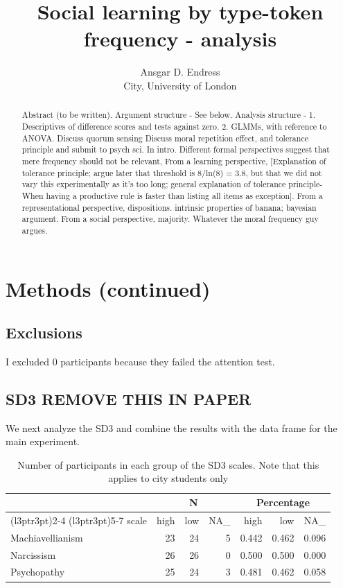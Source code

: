 \documentclass[
]{article}
\title{Social learning by type-token frequency - analysis}
\author{Ansgar D. Endress\\
City, University of London}
\date{}
\begin{document}
\maketitle
\begin{abstract}
Abstract (to be written). Argument structure - See below. Analysis structure - 1. Descriptives of difference scores and tests against zero. 2. GLMMs, with reference to ANOVA. Discuss quorum sensing \citep{Sumpter2009} Discuss moral repetition effect, and tolerance principle and submit to psych sci. In intro. Different formal perspectives suggest that mere frequency should not be relevant, From a learning perspective, {[}Explanation of tolerance principle; argue later that threshold is 8/ln(8) = 3.8, but that we did not vary this experimentally as it's too long; general explanation of tolerance principle- When having a productive rule is faster than listing all items as exception{]}. From a representational perspective, dispositions. intrinsic properties of banana; bayesian argument. From a social perspective, majority. Whatever the moral frequency guy argues.
\end{abstract}

\section{Methods (continued)}\label{methods-continued}

\subsection{Exclusions}\label{exclusions}

I excluded 0 participants because they failed the attention test.

\subsection{SD3 REMOVE THIS IN PAPER}\label{sd3-remove-this-in-paper}

We next analyze the SD3 and combine the results with the data frame for the main experiment.

\begin{table}
\centering
\caption{\label{tab:analyze-sd3-add-median-split}Number of participants in each group of the SD3 scales. Note that this applies to city students only}
\centering
\begin{tabular}[t]{lrrrrrr}
\toprule
\multicolumn{1}{c}{\textbf{ }} & \multicolumn{3}{c}{\textbf{N}} & \multicolumn{3}{c}{\textbf{Percentage}} \\
\cmidrule(l{3pt}r{3pt}){2-4} \cmidrule(l{3pt}r{3pt}){5-7}
scale & high & low & NA\_ & high & low & NA\_\\
\midrule
Machiavellianism & 23 & 24 & 5 & 0.442 & 0.462 & 0.096\\
Narcissism & 26 & 26 & 0 & 0.500 & 0.500 & 0.000\\
Psychopathy & 25 & 24 & 3 & 0.481 & 0.462 & 0.058\\
\bottomrule
\end{tabular}
\end{table}
\end{document}
